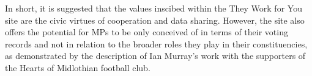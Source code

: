 In short, it is suggested that the values inscibed within the They Work for You site are the civic virtues of cooperation and data sharing.
However, the site also offers the potential for MPs to be only conceived of in terms of their voting records and not in relation to the broader roles they play in their constituencies, as demonstrated by the description of Ian Murray's work with the supporters of the Hearts of Midlothian football club.